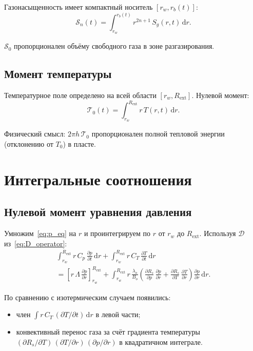 \documentclass[12pt,a4paper]{article}
\newcommand{\dd}{\mathrm{d}}
\newcommand{\pp}{\partial}
\newcommand{\ext}{\mathrm{ext}}
\begin{document}
Газонасыщенность имеет компактный носитель $[r_w, r_b(t)]$:
\begin{equation}\label{eq:Sn}
  \mathcal{S}_n(t) = \int_{r_w}^{r_b(t)} r^{2n+1}\,S_g(r,t)\,\dd r.
\end{equation}

$\mathcal{S}_0$ пропорционален объёму свободного газа
в зоне разгазирования.

\subsection{Момент температуры}

Температурное поле определено на всей области $[r_w, R_\ext]$.
Нулевой момент:
\begin{equation}\label{eq:Tn}
  \mathcal{T}_0(t) = \int_{r_w}^{R_\ext} r\,T(r,t)\,\dd r.
\end{equation}

Физический смысл: $2\pi h\,\mathcal{T}_0$ пропорционален
полной тепловой энергии (отклонению от $T_0$) в пласте.


\section{Интегральные соотношения}\label{sec:integral_rel}

\subsection{Нулевой момент уравнения давления}

Умножим~\eqref{eq:p_eq} на $r$ и проинтегрируем по $r$
от $r_w$ до $R_\ext$. Используя $\mathcal{D}$
из~\eqref{eq:D_operator}:
\begin{multline}\label{eq:moment0}
  \boxed{
    \int_{r_w}^{R_\ext} r\,C_p\,\frac{\pp p}{\pp t}\,\dd r
    + \int_{r_w}^{R_\ext} r\,C_T\,\frac{\pp T}{\pp t}\,\dd r
  } \\
  \boxed{
    = \left[r\,\Lambda\,\frac{\pp p}{\pp r}\right]_{r_w}^{R_\ext}
    + \int_{r_w}^{R_\ext}
      r\,\frac{\lambda_o}{B_o}\!\left(
        \frac{\pp R_s}{\pp p}\,\frac{\pp p}{\pp r}
        + \frac{\pp R_s}{\pp T}\,\frac{\pp T}{\pp r}
      \right)\frac{\pp p}{\pp r}\,\dd r.
  }
\end{multline}

По сравнению с изотермическим случаем появились:
\begin{itemize}[nosep]
  \item член $\int r\,C_T\,(\pp T/\pp t)\,\dd r$ в левой части;
  \item конвективный перенос газа за счёт градиента температуры
        $(\pp R_s/\pp T)\,(\pp T/\pp r)\,(\pp p/\pp r)$ в квадратичном
        интеграле.
\end{itemize}
\end{document}
